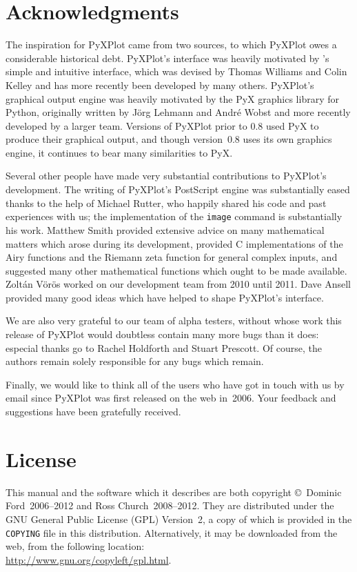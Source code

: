 \section{Acknowledgments}

The inspiration for PyXPlot came from two sources, to which PyXPlot owes a
considerable historical debt. PyXPlot's interface was heavily motivated by
\gnuplot's simple and intuitive interface, which was devised by Thomas Williams
and Colin Kelley and has more recently been developed by many others. PyXPlot's
graphical output engine was heavily motivated by the PyX graphics
library for Python, originally written by J\"org Lehmann and Andr\'e Wobst and
more recently developed by a larger team.  Versions of PyXPlot prior to $0.8$
used PyX to produce their graphical output, and though version~$0.8$ uses its
own graphics engine, it continues to bear many similarities to PyX.

Several other people have made very substantial contributions to PyXPlot's
development. The writing of PyXPlot's PostScript engine was substantially eased
thanks to the help of Michael Rutter, who happily shared his code and past
experiences with us; the implementation of the {\tt image} command is
substantially his work. Matthew Smith provided extensive advice on many
mathematical matters which arose during its development, provided C
implementations of the Airy functions and the Riemann zeta function for general
complex inputs, and suggested many other mathematical functions which ought to
be made available.  Zolt\'an V\"or\"os worked on our development team from 2010
until 2011.  Dave Ansell provided many good ideas which have helped to shape
PyXPlot's interface.

We are also very grateful to our team of alpha testers, without whose work this
release of PyXPlot would doubtless contain many more bugs than it does:
especial thanks go to Rachel Holdforth and Stuart Prescott. Of course, the
authors remain solely responsible for any bugs which remain.

Finally, we would like to think all of the users who have got in touch with us
by email since PyXPlot was first released on the web in~2006. Your feedback and
suggestions have been gratefully received.

\section{License}

This manual and the software which it describes are both copyright \copyright\
Dominic Ford~2006--2012 and Ross Church~2008--2012.  They are distributed under
the GNU General Public License (GPL) Version~2, a copy of which is provided in
the {\tt COPYING} file in this distribution.\index{General Public
License}\index{license} Alternatively, it may be downloaded from the web, from
the following location:\\ \url{http://www.gnu.org/copyleft/gpl.html}.

